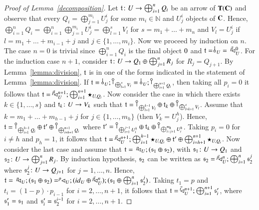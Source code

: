\begin{proof}[Proof of Lemma~\ref{decomposition}]
Let $\mathfrak{t}\colon U \to \bigoplus_{i=1}^n Q_i$ be an arrow of $\mathbf{T}(\mathbf{C})$ and observe that every $Q_i=\bigoplus_{j=1}^{m_i} U_j^i$ for some $m_i\in \mathbb{N}$ and $U_j^i$ objects of $\mathbf{C}$. Hence, $\bigoplus_{i=1}^n Q_i = \bigoplus_{i=1}^n \bigoplus_{j=1}^{m_i} U_j^i= \bigoplus_{l=1}^s V_l$ for $s=m_1+\dots + m_n$ and $V_l = U_j^i$ if $l=m_1+\dots + m_{i-1}+j$ and  $j\in \{1,\dots,m_i\}$. Now we proceed by induction on $n$. The case $n=0$ is trivial since $\bigoplus_{i=1}^n Q_i$ is the final object $0$ and $\t= \bangp{U}=\,\diagpn{\vec{p}\;}{U}{0}$. For the induction case $n+1$, consider $\mathfrak{t}\colon U \to Q_1 \oplus \bigoplus_{j=1}^n R_j$ for $R_j=Q_{j+1}$. By Lemma~\ref{lemma:division}, $\mathfrak{t}$ is in one of the forms indicated in the statement of Lemma~\ref{lemma:division}. If $\t= \bang{U}; \cobang{\bigoplus_{l=1}^s V_l}= \bang{U}; \cobang{\bigoplus_{i=1}^{n+1} Q_i}$, then taking all $p_i=0$ it follows that $\mathfrak{t}=^{\;\vec{p}}\!\!\! \lhd_{U}^{n+1} ; \bigoplus_{i=1}^{n+1} \star_{U,Q_i}$. Now consider the case in which there exists $k\in \{1,\dots,s\}$ and $\mathfrak{t}_k\colon U \to V_k$ such that $\t = \cobang{\bigoplus_{l=1}^{k-1} V_l} \oplus \t_k \oplus \cobang{\bigoplus_{l=k+1}^{s} V_l}$. Assume that $k=m_1+\dots + m_{h-1}+j$ for $j\in \{1,\dots,m_h\}$ (then $V_k= U_j^h$). Hence, $\t= \cobang{\bigoplus_{i=1}^{h-1} Q_i} \oplus \t' \oplus \cobang{\bigoplus_{i=h+1}^{n+1} Q_i}$ where $\t' = \cobang{\bigoplus_{i=1}^{j-1} U_i^h} \oplus \t_k \oplus \cobang{\bigoplus_{i=j+1}^{m_h} U_i^h}$. Taking $p_i=0$ for $i\neq h$ and $p_h=1$, it follows that $\mathfrak{t}=^{\;\vec{p}}\!\!\! \lhd_{U}^{n+1} ; \bigoplus_{i=1}^{h-1} \star_{U,Q_i} \oplus \mathfrak{t}' \oplus \bigoplus_{i=h+1}^{n+1} \star_{U,Q_i}$. Now consider the last case and assume that $\mathfrak{t}=\,^p\!\! \lhd_{U};(\mathfrak{s}_1\oplus \mathfrak{s}_2)$, with $\mathfrak{s}_1\colon U \to Q_1$ and $\mathfrak{s}_2\colon U \to \bigoplus_{j=1}^n R_j$. By induction hypothesis, $\mathfrak{s}_2$ can be written as $\mathfrak{s}_2 = ^{\;\vec{p}}\!\!\! \lhd_{U}^{n} ; \bigoplus_{i=1}^n \mathfrak{s}_2^j$ where $\mathfrak{s}_2^j\colon U \to Q_{j+1}$ for $j=1,\dots, n$. Hence, $\mathfrak{t} =\, ^p\!\! \lhd_{U};(\mathfrak{s}_1\oplus \mathfrak{s}_2) = ^p\!\! \lhd_{U};({id}_{U} \oplus ^{\;\vec{p}}\!\!\! \lhd_{U}^{n}) ; (\mathfrak{s}_1 \oplus \bigoplus_{i=1}^n \mathfrak{s}_2^j)$. Taking $t_1=p$ and $t_i = (1-p)\cdot p_{i-1}$ for $i=2,\dots, n+1$, it follows that $\mathfrak{t}=^{\;\vec{t}}\!\!\! \lhd_{U}^{n+1} ; \bigoplus_{i=1}^{n+1}\mathfrak{s}'_i$, where $\mathfrak{s}'_1 = \mathfrak{s}_1$ and $\mathfrak{s}'_i = \mathfrak{s}_2^{i-1}$ for $i=2,\dots, n+1$.

%
%
\end{proof}



